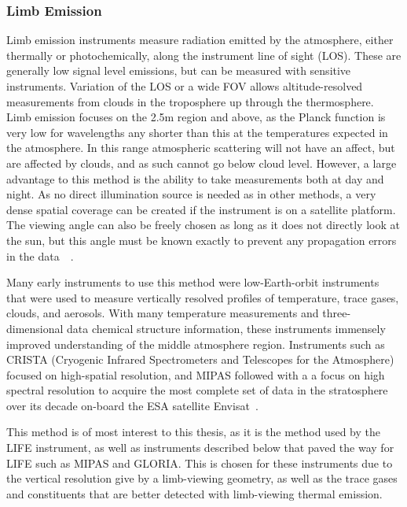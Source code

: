 \subsubsection{Limb Emission}
Limb emission instruments measure radiation emitted by the atmosphere, either thermally or photochemically, along the instrument line of sight (LOS). These are generally low signal level emissions, but can be measured with sensitive instruments. Variation of the LOS or a wide FOV allows altitude-resolved measurements from clouds in the troposphere up through the thermosphere. Limb emission focuses on the 2.5\textmu m region and above, as the Planck function is very low for wavelengths any shorter than this at the temperatures expected in the atmosphere. In this range atmospheric scattering will not have an affect, but are affected by clouds, and as such cannot go below cloud level. However, a large advantage to this method is the ability to take measurements both at day and night. As no direct illumination source is needed as in other methods, a very dense spatial coverage can be created if the instrument is on a satellite platform. The viewing angle can also be freely chosen as long as it does not directly look at the sun, but this angle must be known exactly to prevent any propagation errors in the data~\citep{IR_limb_emission_measurements}~\citep{SPARC}.

Many early instruments to use this method were low-Earth-orbit instruments that were used to measure vertically resolved profiles of temperature, trace gases, clouds, and aerosols. With many temperature measurements and three-dimensional data chemical structure information, these instruments immensely improved understanding of the middle atmosphere region. Instruments such as CRISTA (Cryogenic Infrared Spectrometers and Telescopes for the Atmosphere) focused on high-spatial resolution, and MIPAS followed with a a focus on high spectral resolution to acquire the most complete set of data in the stratosphere over its decade on-board the ESA satellite Envisat~\cite{GLORIA_objectives}.

This method is of most interest to this thesis, as it is the method used by the LIFE instrument, as well as instruments described below that paved the way for LIFE such as MIPAS and GLORIA. This is chosen for these instruments due to the vertical resolution give by a limb-viewing geometry, as well as the trace gases and constituents that are better detected with limb-viewing thermal emission.

